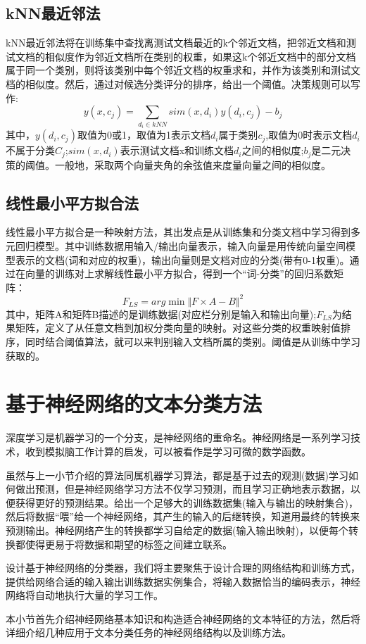 \documentclass[UTF8]{ctexart}
\begin{document}
\subsection{kNN最近邻法}
	kNN最近邻法将在训练集中查找离测试文档最近的k个邻近文档，把邻近文档和测试文档的相似度作为邻近文档所在类别的权重，如果这k个邻近文档中的部分文档属于同一个类别，则将该类别中每个邻近文档的权重求和，并作为该类别和测试文档的相似度。然后，通过对候选分类评分的排序，给出一个阈值。决策规则可以写作:
	\begin{displaymath}
		y(x,c_j)=\sum_{d_i\in kNN}sim(x,d_i)y(d_i,c_j)-b_j
	\end{displaymath}
	其中，$y(d_i,c_j)$取值为0或1，取值为1表示文档$d_i$属于类别$c_j$,取值为0时表示文档$d_i$不属于分类$C_j$;$sim(x,d_i)$表示测试文档x和训练文档$d_i$之间的相似度;$b_j$是二元决策的阈值。一般地，采取两个向量夹角的余弦值来度量向量之间的相似度。

\subsection{线性最小平方拟合法}
	线性最小平方拟合是一种映射方法，其出发点是从训练集和分类文档中学习得到多元回归模型。其中训练数据用输入/输出向量表示，输入向量是用传统向量空间模型表示的文档(词和对应的权重)，输出向量则是文档对应的分类(带有0-1权重)。通过在向量的训练对上求解线性最小平方拟合，得到一个“词-分类”的回归系数矩阵：
	\begin{displaymath}
		F_{LS}=arg\min {\Vert F \times A - B \Vert}^2
	\end{displaymath}
	其中，矩阵A和矩阵B描述的是训练数据(对应栏分别是输入和输出向量);$F_{LS}$为结果矩阵，定义了从任意文档到加权分类向量的映射。对这些分类的权重映射值排序，同时结合阈值算法，就可以来判别输入文档所属的类别。阈值是从训练中学习获取的。

\section{基于神经网络的文本分类方法}
	深度学习是机器学习的一个分支，是神经网络的重命名。神经网络是一系列学习技术，收到模拟脑工作计算的启发，可以被看作是学习可微的数学函数。
	\par 虽然与上一小节介绍的算法同属机器学习算法，都是基于过去的观测(数据)学习如何做出预测，但是神经网络学习方法不仅学习预测，而且学习正确地表示数据，以便获得更好的预测结果。给出一个足够大的训练数据集(输入与输出的映射集合)，然后将数据“喂”给一个神经网络，其产生的输入的后继转换，知道用最终的转换来预测输出。神经网络产生的转换都学习自给定的数据(输入输出映射)，以便每个转换都使得更易于将数据和期望的标签之间建立联系。
	\par 设计基于神经网络的分类器，我们将主要聚焦于设计合理的网络结构和训练方式，提供给网络合适的输入输出训练数据实例集合，将输入数据恰当的编码表示，神经网络将自动地执行大量的学习工作。
	\par 本小节首先介绍神经网络基本知识和构造适合神经网络的文本特征的方法，然后将详细介绍几种应用于文本分类任务的神经网络结构以及训练方法。
\end{document}
